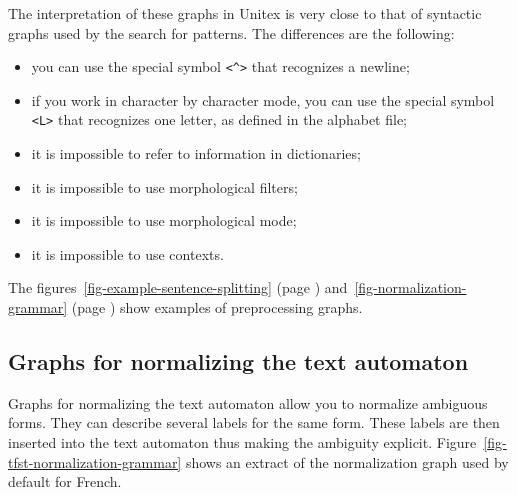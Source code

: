 \bigskip
\noindent The interpretation of these graphs in Unitex is very close to that of
syntactic graphs used by the search for patterns. The differences are the following:
\begin{itemize}
  \item you can use the special symbol \verb+<^>+ that recognizes a newline;\index{\verb+<^>+}
  \item if you work in character by character mode, you can use the special
  symbol \verb+<L>+ that recognizes one letter, as defined in
  the alphabet file;
  \item it is impossible to refer to information in dictionaries;
  \item it is impossible to use morphological filters;
  \item it is impossible to use morphological mode;
  \item it is impossible to use contexts.
\end{itemize}

The figures~\ref{fig-example-sentence-splitting} (page
\pageref{fig-example-sentence-splitting})
and~\ref{fig-normalization-grammar} (page
\pageref{fig-normalization-grammar}) show examples of preprocessing graphs.


\subsection{Graphs for normalizing the text automaton}
\label{section-normalizing-text-automataon}
Graphs for normalizing the text automaton allow you to normalize
ambiguous forms. They can describe several labels for the same form.
These labels are then inserted into the text automaton thus making the
ambiguity explicit. Figure~\ref{fig-tfst-normalization-grammar} shows an
extract of the normalization graph used by default for French.

